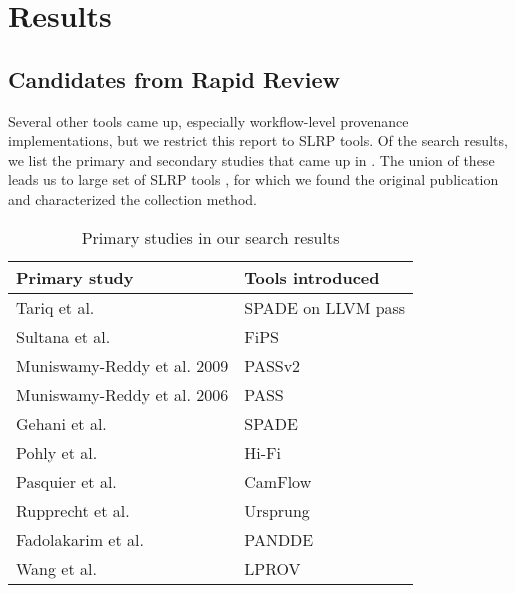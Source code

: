 
\section{Results}


\subsection{Candidates from Rapid Review}
\label{section:candidates}

Several other tools came up, especially workflow-level provenance implementations, but we restrict this report to SLRP tools.
Of the search results, we list the primary and secondary studies that came up in .
The union of these leads us to large set of SLRP tools , for which we found the original publication and characterized the collection method.

\begin{table}
\caption{Primary studies in our search results}
\label{table:primary-studies}
\begin{tabular}{ll}
Primary study                                                            & Tools introduced   \\
\midrule                                                                
Tariq et al. \cite{tariq_towards_2012}                                   & SPADE on LLVM pass \\
Sultana et al. \cite{sultana_file_2013}                                  & FiPS               \\
Muniswamy-Reddy et al. 2009 \cite{muniswamy-reddy_layering_2009}         & PASSv2             \\
Muniswamy-Reddy et al. 2006 \cite{muniswamy-reddy_provenance-aware_2006} & PASS               \\
Gehani et al. \cite{gehani_spade_2012}                                   & SPADE              \\
Pohly et al. \cite{pohly_hi-fi_2012}                                     & Hi-Fi              \\
Pasquier et al. \cite{pasquier_practical_2017}                           & CamFlow            \\
Rupprecht et al. \cite{rupprecht_improving_2020}                         & Ursprung           \\
Fadolakarim et al. \cite{fadolalkarim_pandde_2016}                       & PANDDE             \\
Wang et al. \cite{wang_lprov_2018}                                       & LPROV              \\
\end{tabular}
\end{table}

